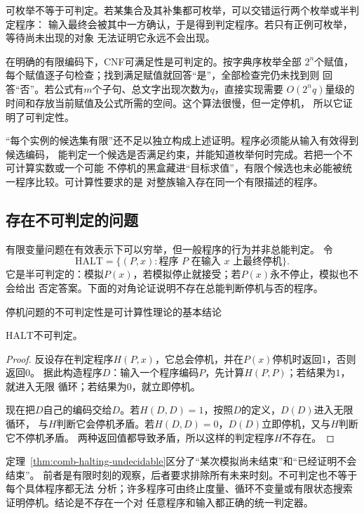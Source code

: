 可枚举不等于可判定。若某集合及其补集都可枚举，可以交错运行两个枚举或半判定程序：
输入最终会被其中一方确认，于是得到判定程序。若只有正例可枚举，等待尚未出现的对象
无法证明它永远不会出现。

在明确的有限编码下，CNF可满足性是可判定的。按字典序枚举全部
$2^n$个赋值，每个赋值逐子句检查；找到满足赋值就回答“是”，全部检查完仍未找到则
回答“否”。若公式有$m$个子句、总文字出现次数为$q$，直接实现需要
$O(2^n q)$量级的时间和存放当前赋值及公式所需的空间。这个算法很慢，但一定停机，
所以它证明了可判定性。

“每个实例的候选集有限”还不足以独立构成上述证明。程序必须能从输入有效得到候选编码，
能判定一个候选是否满足约束，并能知道枚举何时完成。若把一个不可计算实数或一个可能
不停机的黑盒藏进“目标求值”，有限个候选也未必能被统一程序比较。可计算性要求的是
对整族输入存在同一个有限描述的程序。

\subsection{存在不可判定的问题}

有限变量问题在有效表示下可以穷举，但一般程序的行为并非总能判定。
令
\[
  \mathrm{HALT}
  =
  \{(P,x):\text{程序 }P\text{ 在输入 }x\text{ 上最终停机}\}.
\]
它是半可判定的：模拟$P(x)$，若模拟停止就接受；若$P(x)$永不停止，模拟也不会给出
否定答案。下面的对角论证说明不存在总能判断停机与否的程序。

停机问题的不可判定性是可计算性理论的基本结论
\begin{theorem}[停机问题不可判定]
\label{thm:comb-halting-undecidable}
$\mathrm{HALT}$不可判定。
\end{theorem}

\begin{proof}
反设存在判定程序$H(P,x)$，它总会停机，并在$P(x)$停机时返回$1$，否则返回$0$。
据此构造程序$D$：输入一个程序编码$P$，先计算$H(P,P)$；若结果为$1$，就进入无限
循环；若结果为$0$，就立即停机。

现在把$D$自己的编码交给$D$。若$H(D,D)=1$，按照$D$的定义，$D(D)$进入无限循环，
与$H$判断它会停机矛盾。若$H(D,D)=0$，$D(D)$立即停机，又与$H$判断它不停机矛盾。
两种返回值都导致矛盾，所以这样的判定程序$H$不存在。
\end{proof}

定理~\ref{thm:comb-halting-undecidable}区分了“某次模拟尚未结束”和“已经证明不会结束”。
前者是有限时刻的观察，后者要求排除所有未来时刻。不可判定也不等于每个具体程序都无法
分析；许多程序可由终止度量、循环不变量或有限状态搜索证明停机。结论是不存在一个对
任意程序和输入都正确的统一判定器。

